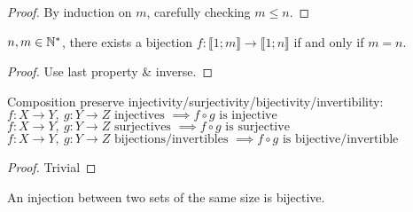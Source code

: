 \begin{proof}
	By induction on $m$, carefully checking $m \leq n$.
\end{proof}
\begin{property}
	$n,m \in \mathbb{N}^*$, there exists a bijection $f:\llbracket 1;m \rrbracket \rightarrow \llbracket 1;n \rrbracket$ if and only if $m=n$.
\end{property}
\begin{proof}
	Use last property \& inverse.
\end{proof}
\begin{property}[Compositions]
	Composition preserve injectivity/surjectivity/bijectivity/invertibility:
	$f: X \to Y, \ g: Y \to Z \text{ injectives } \implies f \circ g \text{ is injective}$\\
	$f: X \to Y, \ g: Y \to Z \text{ surjectives } \implies f \circ g \text{ is surjective}$\\
	$f: X \to Y, \ g: Y \to Z \text{ bijections/invertibles } \implies f \circ g \text{ is bijective/invertible}$
\end{property}
\begin{proof}
	Trivial
\end{proof}
\begin{property}
	An injection between two sets of the same size is bijective.
\end{property}

